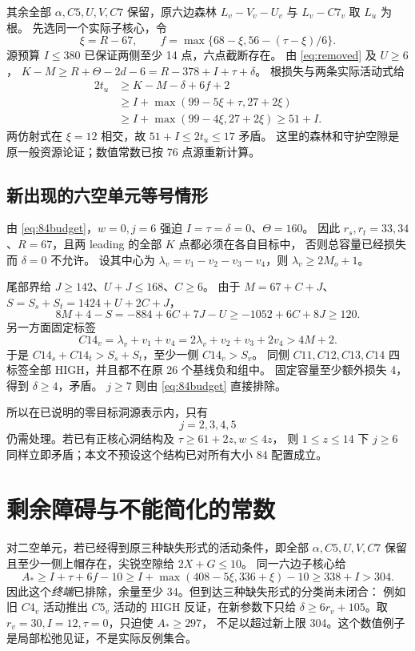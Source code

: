 \documentclass[11pt,a4paper]{article}
\newcommand{\A}{A_*}
\begin{document}
其余全部 $\alpha,C5,U,V,C7$ 保留，原六边森林
$L_v-V_v-U_v$ 与 $L_v-C7_v$ 取 $L_u$ 为根。
先选同一个实际子核心，令
\[\xi=R-67,\qquad f=\max\{68-\xi,56-(\tau-\xi)/6\}.
\]
源预算 $I\le380$ 已保证两侧至少 14 点，六点截断存在。
由 \eqref{eq:removed} 及 $U\ge6$，
$K-M\ge R+\Theta-2d-6=R-378+I+\tau+\delta$。
根损失与两条实际活动式给
\[
\begin{aligned}
2t_u&\ge K-M-\delta+6f+2\\
&\ge I+\max(99-5\xi+\tau,27+2\xi)\\
&\ge I+\max(99-4\xi,27+2\xi)\ge51+I.
\end{aligned}
\]
两仿射式在 $\xi=12$ 相交，故 $51+I\le2t_u\le17$ 矛盾。
这里的森林和守护空隙是原一般资源论证；数值常数已按 76 点源重新计算。

\subsection*{新出现的六空单元等号情形}
由 \eqref{eq:84budget}，$w=0,j=6$ 强迫 $I=\tau=\delta=0$、$\Theta=160$。
因此 $r_s,r_t=33,34$、$R=67$，且两 leading 的全部 $K$ 点都必须在各自目标中，
否则总容量已经损失而 $\delta=0$ 不允许。
设其中心为 $\lambda_v=v_1-v_2-v_3-v_4$，则
$\lambda_v\ge2M_o+1$。

尾部界给 $J\ge142$、$U+J\le168$、$C\ge6$。
由于 $M=67+C+J$、$S=S_s+S_t=1424+U+2C+J$，
\[
8M+4-S=-884+6C+7J-U
\ge-1052+6C+8J\ge120.
\]
另一方面固定标签
\[
C14_v=\lambda_v+v_1+v_4
=2\lambda_v+v_2+v_3+2v_4>4M+2.
\]
于是 $C14_s+C14_t>S_s+S_t$，至少一侧 $C14_v>S_v$。
同侧 $C11,C12,C13,C14$ 四标签全部 HIGH，并且都不在原 26 个基线负和组中。
固定容量至少额外损失 4，得到 $\delta\ge4$，矛盾。
$j\ge7$ 则由 \eqref{eq:84budget} 直接排除。

所以在已说明的零目标洞源表示内，只有
\[\boxed{j=2,3,4,5}\]
仍需处理。若已有正核心洞结构及 $\tau\ge61+2z,w\le4z$，
则 $1\le z\le14$ 下 $j\ge6$ 同样立即矛盾；本文不预设这个结构已对所有大小 84 配置成立。

\newpage
\section{剩余障碍与不能简化的常数}\label{sec:limits}
对二空单元，若已经得到原三种缺失形式的活动条件，即全部
$\alpha,C5,U,V,C7$ 保留且至少一侧上帽存在，尖锐空隙给 $2X+G\le10$。
同一六边子核心给
\[
\A\ge I+\tau+6f-10
\ge I+\max(408-5\xi,336+\xi)-10\ge338+I>304.
\]
因此这个\emph{终端}已排除，余量至少 34。但到达三种缺失形式的分类尚未闭合：
例如旧 $C4_v$ 活动推出 $C5_v$ 活动的 HIGH 反证，在新参数下只给
$\delta\ge6r_v+105$。取 $r_v=30,I=12,\tau=0$，只迫使 $\A\ge297$，
不足以超过新上限 304。这个数值例子是局部松弛见证，不是实际反例集合。
\end{document}

